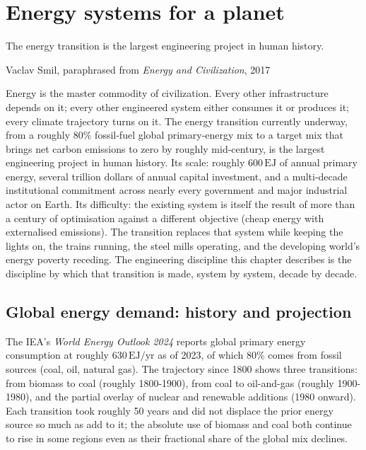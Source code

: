 \chapter{Energy systems for a planet}
\label{vol12:ch02}

\epigraph{The energy transition is the largest engineering project in human history.}{Vaclav Smil, paraphrased from \emph{Energy and Civilization}, 2017}


\noindent
Energy is the master commodity of civilization. Every other infrastructure depends on it; every other engineered system either consumes it or produces it; every climate trajectory turns on it. The energy transition currently underway, from a roughly $80\%$ fossil-fuel global primary-energy mix to a target mix that brings net carbon emissions to zero by roughly mid-century, is the largest engineering project in human history. Its scale: roughly $600\,\text{EJ}$ of annual primary energy, several trillion dollars of annual capital investment, and a multi-decade institutional commitment across nearly every government and major industrial actor on Earth. Its difficulty: the existing system is itself the result of more than a century of optimisation against a different objective (cheap energy with externalised emissions). The transition replaces that system while keeping the lights on, the trains running, the steel mills operating, and the developing world's energy poverty receding. The engineering discipline this chapter describes is the discipline by which that transition is made, system by system, decade by decade.

\section{Global energy demand: history and projection}

The IEA's \emph{World Energy Outlook 2024} reports global primary energy consumption at roughly $630\,\text{EJ/yr}$ as of 2023, of which $80\%$ comes from fossil sources (coal, oil, natural gas). The trajectory since 1800 shows three transitions: from biomass to coal (roughly 1800-1900), from coal to oil-and-gas (roughly 1900-1980), and the partial overlay of nuclear and renewable additions (1980 onward). Each transition took roughly 50 years and did not displace the prior energy source so much as add to it; the absolute use of biomass and coal both continue to rise in some regions even as their fractional share of the global mix declines.

